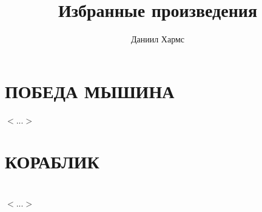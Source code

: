 \documentclass[a4paper,12pt]{book}
\title{Избранные произведения}
\author{Даниил Хармс}
\begin{document}
	
	\maketitle
	\tableofcontents
	
	\chapter{ПОБЕДА МЫШИНА}
	
	\begin{flushright}
		$<...>$
	\end{flushright}
	
	
	\chapter{КОРАБЛИК}
	
	
	\chapter{}
	
	\begin{flushright}
		$<...>$
	\end{flushright}
	
	
\end{document}
